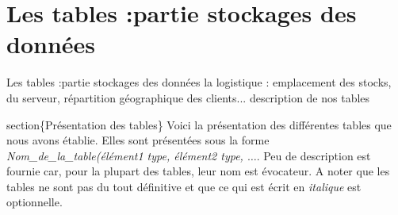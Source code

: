 \section{Les tables :partie stockages des données}
Les tables :partie stockages des données
la logistique : emplacement des stocks, du serveur, répartition géographique des clients...
description de nos tables

section\{Présentation des tables\}
Voici la présentation des différentes tables que nous avons établie. Elles sont présentées sous la forme \textit{Nom\_de\_la\_table(élément1 type, élément2 type, $\dots$}. Peu de description est fournie car, pour la plupart des tables, leur nom est évocateur. A noter que les tables ne sont pas du tout définitive et que ce qui est écrit en \textit{italique} est optionnelle.\bigskip

